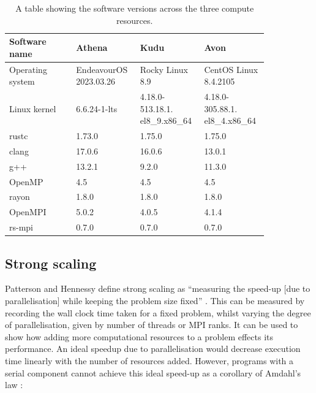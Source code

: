 \begin{table}[H]
    \caption{A table showing the software versions across the three compute resources.}
    \label{table:perfTools}
    \begin{tabular}{|p{0.24\linewidth}||p{0.2\linewidth}|p{0.2\linewidth}|p{0.2\linewidth}|}
    \hline
    \textbf{Software name} & \textbf{Athena} & \textbf{Kudu} & \textbf{Avon} \\
    \hline\hline
    Operating system & EndeavourOS 2023.03.26 & Rocky Linux 8.9                & CentOS Linux 8.4.2105          \\\hline
    Linux kernel     & 6.6.24-1-lts                     & 4.18.0-513.18.1. el8\_9.x86\_64 & 4.18.0-305.88.1. el8\_4.x86\_64 \\\hline
    rustc            & 1.73.0                           & 1.75.0                         & 1.75.0                         \\\hline
    clang            & 17.0.6                           & 16.0.6                         & 13.0.1                         \\\hline
    g++              & 13.2.1                           & 9.2.0                          & 11.3.0                         \\\hline
    OpenMP           & 4.5                              & 4.5                            & 4.5                            \\\hline
    rayon            & 1.8.0                            & 1.8.0                          & 1.8.0                          \\\hline
    OpenMPI          & 5.0.2                            & 4.0.5                          & 4.1.4                          \\\hline
    rs-mpi           & 0.7.0                            & 0.7.0                          & 0.7.0                          \\\hline
    \end{tabular}
\end{table}


\subsection{Strong scaling}
\label{ssec:strong-scaling}

Patterson and Hennessy define strong scaling as ``measuring the speed-up [due to parallelisation] while keeping the problem size fixed'' \cite{pattersonHennessyComputerOrganisationArchitecture}. This can be measured by recording the wall clock time taken for a fixed problem, whilst varying the degree of parallelisation, given by number of threads or MPI ranks. It can be used to show how adding more computational resources to a problem effects its performance. An ideal speedup due to parallelisation would decrease execution time linearly with the number of resources added. However, programs with a serial component cannot achieve this ideal speed-up as a corollary of Amdahl's law \cite{amdahlsLaw}:

